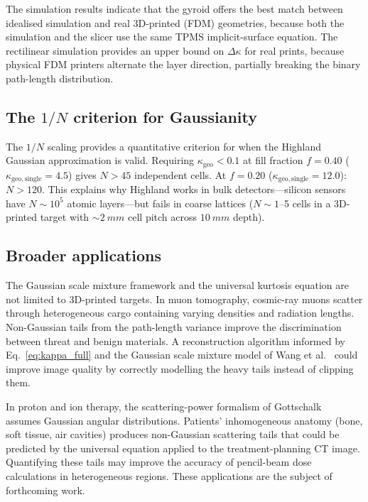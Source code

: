 \documentclass[final,5p,times,twocolumn]{elsarticle}
\begin{document}
The simulation results indicate that the gyroid offers the best match between idealised simulation and real 3D-printed (FDM) geometries, because both the simulation and the slicer use the same TPMS implicit-surface equation.  The rectilinear simulation provides an upper bound on $\Delta\kappa$ for real prints, because physical FDM printers alternate the layer direction, partially breaking the binary path-length distribution.

\subsection{The \texorpdfstring{$1/N$}{1/N} criterion for Gaussianity}
\label{sec:criterion}

The $1/N$ scaling provides a quantitative criterion for when the Highland Gaussian approximation is valid.  Requiring $\kappa_{\mathrm{geo}}<0.1$ at fill fraction $f=0.40$ ($\kappa_{\mathrm{geo,single}}=4.5$) gives $N > 45$ independent cells.  At $f=0.20$ ($\kappa_{\mathrm{geo,single}}=12.0$): $N>120$.  This explains why Highland works in bulk detectors---silicon sensors have $N\sim 10^5$ atomic layers---but fails in coarse lattices ($N\sim 1$--5 cells in a 3D-printed target with $\sim\SI{2}{mm}$ cell pitch across $\SI{10}{mm}$ depth).

\subsection{Broader applications}
\label{sec:broader}

The Gaussian scale mixture framework and the universal kurtosis equation are not limited to 3D-printed targets.  In muon tomography, cosmic-ray muons scatter through heterogeneous cargo containing varying densities and radiation lengths.  Non-Gaussian tails from the path-length variance improve the discrimination between threat and benign materials.  A reconstruction algorithm informed by Eq.~\eqref{eq:kappa_full} and the Gaussian scale mixture model of Wang et al.~\cite{Wang2009} could improve image quality by correctly modelling the heavy tails instead of clipping them.

In proton and ion therapy, the scattering-power formalism of Gottschalk~\cite{Gottschalk2010} assumes Gaussian angular distributions.  Patients' inhomogeneous anatomy (bone, soft tissue, air cavities) produces non-Gaussian scattering tails that could be predicted by the universal equation applied to the treatment-planning CT image.  Quantifying these tails may improve the accuracy of pencil-beam dose calculations in heterogeneous regions.  These applications are the subject of forthcoming work.
\end{document}
